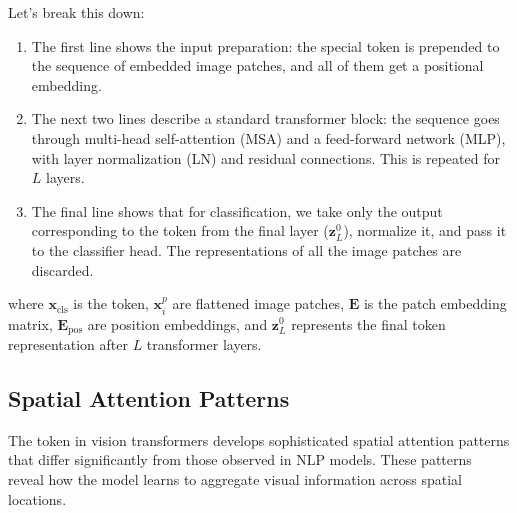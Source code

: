 Let's break this down:
\begin{enumerate}
\item The first line shows the input preparation: the special \cls{} token is prepended to the sequence of embedded image patches, and all of them get a positional embedding.
\item The next two lines describe a standard transformer block: the sequence goes through multi-head self-attention (MSA) and a feed-forward network (MLP), with layer normalization (LN) and residual connections. This is repeated for $L$ layers.
\item The final line shows that for classification, we take only the output corresponding to the \cls{} token from the final layer ($\mathbf{z}_L^0$), normalize it, and pass it to the classifier head. The representations of all the image patches are discarded.
\end{enumerate}
\begin{comment}
Feedback: These equations are dense for non-experts. A brief, intuitive walkthrough would be very helpful. For example:
"Let's break this down:
1. The first line shows the input preparation: the special [CLS] token is prepended to the sequence of embedded image patches, and all of them get a positional embedding.
2. The next two lines describe a standard transformer block: the sequence goes through multi-head self-attention (MSA) and a feed-forward network (MLP), with layer normalization (LN) and residual connections. This is repeated for L layers.
3. The final line shows that for classification, we take only the output corresponding to the [CLS] token from the final layer (z_L^0), normalize it, and pass it to the classifier head. The representations of all the image patches are discarded."

STATUS: addressed - added plain-language walkthrough of the mathematical equations
\end{comment}

where $\mathbf{x}_{\text{cls}}$ is the \cls{} token, $\mathbf{x}_i^p$ are flattened image patches, $\mathbf{E}$ is the patch embedding matrix, $\mathbf{E}_{\text{pos}}$ are position embeddings, and $\mathbf{z}_L^0$ represents the final \cls{} token representation after $L$ transformer layers.

\subsection{Spatial Attention Patterns}

The \cls{} token in vision transformers develops sophisticated spatial attention patterns that differ significantly from those observed in NLP models. These patterns reveal how the model learns to aggregate visual information across spatial locations.

